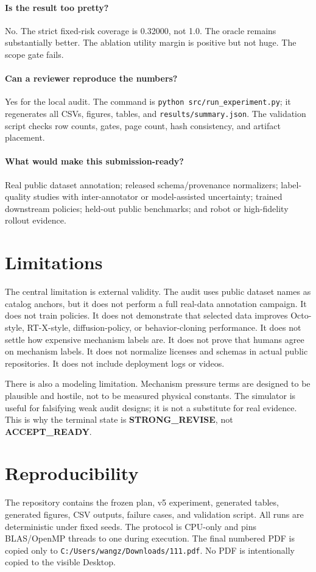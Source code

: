 \documentclass{article}
\begin{document}
\paragraph{Is the result too pretty?}
No. The strict fixed-risk coverage is 0.32000, not 1.0. The oracle remains substantially better. The ablation utility margin is positive but not huge. The scope gate fails.

\paragraph{Can a reviewer reproduce the numbers?}
Yes for the local audit. The command is \texttt{python src/run\_experiment.py}; it regenerates all CSVs, figures, tables, and \texttt{results/summary.json}. The validation script checks row counts, gates, page count, hash consistency, and artifact placement.

\paragraph{What would make this submission-ready?}
Real public dataset annotation; released schema/provenance normalizers; label-quality studies with inter-annotator or model-assisted uncertainty; trained downstream policies; held-out public benchmarks; and robot or high-fidelity rollout evidence.

\section{Limitations}
The central limitation is external validity. The audit uses public dataset names as catalog anchors, but it does not perform a full real-data annotation campaign. It does not train policies. It does not demonstrate that selected data improves Octo-style, RT-X-style, diffusion-policy, or behavior-cloning performance. It does not settle how expensive mechanism labels are. It does not prove that humans agree on mechanism labels. It does not normalize licenses and schemas in actual public repositories. It does not include deployment logs or videos.

There is also a modeling limitation. Mechanism pressure terms are designed to be plausible and hostile, not to be measured physical constants. The simulator is useful for falsifying weak audit designs; it is not a substitute for real evidence. This is why the terminal state is \textbf{STRONG\_REVISE}, not \textbf{ACCEPT\_READY}.

\section{Reproducibility}
The repository contains the frozen plan, v5 experiment, generated tables, generated figures, CSV outputs, failure cases, and validation script. All runs are deterministic under fixed seeds. The protocol is CPU-only and pins BLAS/OpenMP threads to one during execution. The final numbered PDF is copied only to \texttt{C:/Users/wangz/Downloads/111.pdf}. No PDF is intentionally copied to the visible Desktop.
\end{document}
